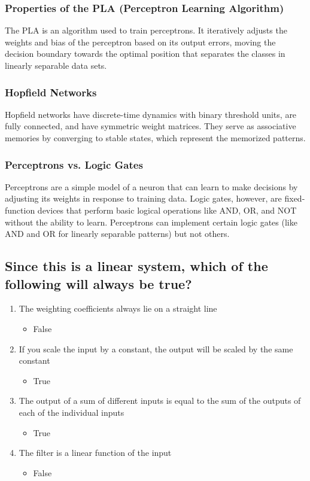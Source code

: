 \documentclass{article}
\begin{document}
\subsubsection*{Properties of the PLA (Perceptron Learning Algorithm)}
The PLA is an algorithm used to train perceptrons. It iteratively adjusts the weights and bias of the perceptron based on its output errors, moving the decision boundary towards the optimal position that separates the classes in linearly separable data sets.

\subsubsection*{Hopfield Networks}
Hopfield networks have discrete-time dynamics with binary threshold units, are fully connected, and have symmetric weight matrices. They serve as associative memories by converging to stable states, which represent the memorized patterns.

\subsubsection*{Perceptrons vs. Logic Gates}
Perceptrons are a simple model of a neuron that can learn to make decisions by adjusting its weights in response to training data. Logic gates, however, are fixed-function devices that perform basic logical operations like AND, OR, and NOT without the ability to learn. Perceptrons can implement certain logic gates (like AND and OR for linearly separable patterns) but not others.

\subsection{Since this is a linear system, which of the following will always be true?}

\begin{enumerate}
    \item The weighting coefficients always lie on a straight line
      \begin{itemize}
        \item False
      \end{itemize}
    \item If you scale the input by a constant, the output will be scaled by the same constant
      \begin{itemize}
        \item True
      \end{itemize}
    \item The output of a sum of different inputs is equal to the sum of the outputs of each of the individual inputs
      \begin{itemize}
        \item True
      \end{itemize}
    \item The filter is a linear function of the input
      \begin{itemize}
        \item False
      \end{itemize}
\end{enumerate}
\end{document}
